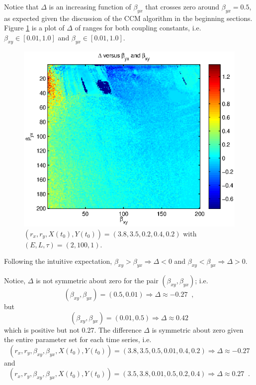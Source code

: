 \documentclass[a4paper,11pt]{article}
\begin{document}
Notice that $\Delta$ is an increasing function of $\beta_{yx}$ that crosses zero around $\beta_{yx}=0.5$, as expected given the discussion of the CCM algorithm in the beginning sections.  Figure \ref{fig:CxyCyxVByxBxy_diff} is a plot of $\Delta$ of ranges for both coupling constants, i.e.\ $\beta_{xy}\in[0.01,1.0]$ and $\beta_{yx}\in[0.01,1.0]$.
\begin{figure}[h!t]
\centering
\label{fig:CxyCyxVByxBxy_diff}
\includegraphics[scale=0.55]{CxyCyxVByxBxy_diff.eps}
\caption{$\left(r_x,r_y,X(t_0),Y(t_0)\right) = \left(3.8,3.5,0.2,0.4,0.2\right)$ with $\left(E,L,\tau\right)=\left(2,100,1\right)$.}
\end{figure}
Following the intuitive expectation, $\beta_{xy}>\beta_{yx}\Rightarrow \Delta<0$ and $\beta_{xy}<\beta_{yx}\Rightarrow \Delta>0$.

Notice, $\Delta$ is not symmetric about zero for the pair $(\beta_{xy},\beta_{yx})$; i.e.\
$$
\left(\beta_{xy},\beta_{yx}\right) = \left(0.5,0.01\right) \Rightarrow \Delta \approx -0.27\;\;,
$$
but
$$
\left(\beta_{xy},\beta_{yx}\right) = \left(0.01,0.5\right) \Rightarrow \Delta \approx 0.42
$$
which is positive but not 0.27.  The difference $\Delta$ is symmetric about zero given the entire parameter set for each time series, i.e.\
$$
\left(r_x,r_y,\beta_{xy},\beta_{yx},X(t_0),Y(t_0)\right) = \left(3.8,3.5,0.5,0.01,0.4,0.2\right) \Rightarrow \Delta \approx -0.27
$$
and
$$
\left(r_x,r_y,\beta_{xy},\beta_{yx},X(t_0),Y(t_0)\right) = \left(3.5,3.8,0.01,0.5,0.2,0.4\right) \Rightarrow \Delta \approx 0.27\;\;.
$$
\end{document}
